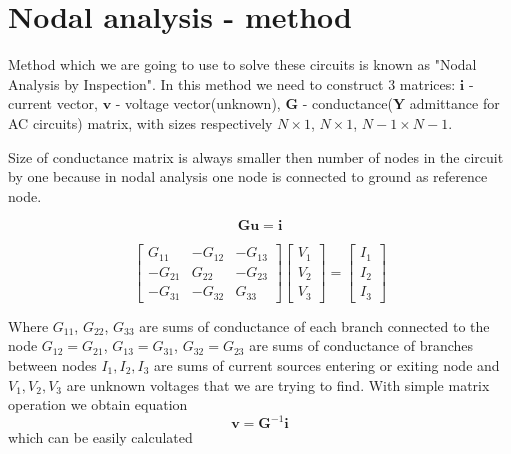 \documentclass[notitlepage, a4paper, 11pt]{article}
\begin{document}
	\section{Nodal analysis - method}\label{sec:Nodal analysis}
	Method which we are going to use to solve these circuits is known as "Nodal Analysis by Inspection". In this method we need to construct 3 matrices: $\mathbf{i}$ - current vector, $\mathbf{v}$ - voltage vector(unknown), $\mathbf{G}$ - conductance($\mathbf{Y}$ admittance for AC circuits) matrix, with sizes respectively $\mathit{N} \times 1$, $\mathit{N} \times 1$, $\mathit{N}-1 \times \mathit{N}-1$.
	
	Size of conductance matrix is always smaller then number of nodes in the circuit by one because in nodal analysis one node is connected to ground as reference node.
	\begin{center} 
		\begin{equation}
			\mathbf{Gu=i}
		\end{equation}
	\end{center}
	
	\begin{center}
		\begin{equation}
			\begin{bmatrix}
				G_{11} & -G_{12} & -G_{13} \\
				-G_{21} & G_{22} & -G_{23} \\
				-G_{31} & -G_{32} & G_{33} 
			\end{bmatrix}
			\begin{bmatrix}
				V_1 \\
				V_2 \\ 
				V_3
			\end{bmatrix}
			=
			\begin{bmatrix}
				I_1 \\
				I_2 \\
				I_3
			\end{bmatrix}
		\end{equation}
	\end{center}
		Where $G_{11}$, $G_{22}$, $G_{33}$ are sums of conductance of each branch connected to the node \newline $G_{12} = G_{21}$, $G_{13} = G_{31}$, $G_{32} = G_{23}$ are sums of conductance of branches between nodes \newline $I_1, I_2, I_3$ are sums of current sources entering or exiting node and $V_1, V_2, V_3$ are unknown voltages that we are trying to find.
		\newline\newline
		With simple matrix operation we obtain equation
		\begin{equation}
			\mathbf{v} = \mathbf{G}^{-1}\mathbf{i}
		\end{equation}
		which can be easily calculated
\end{document}
